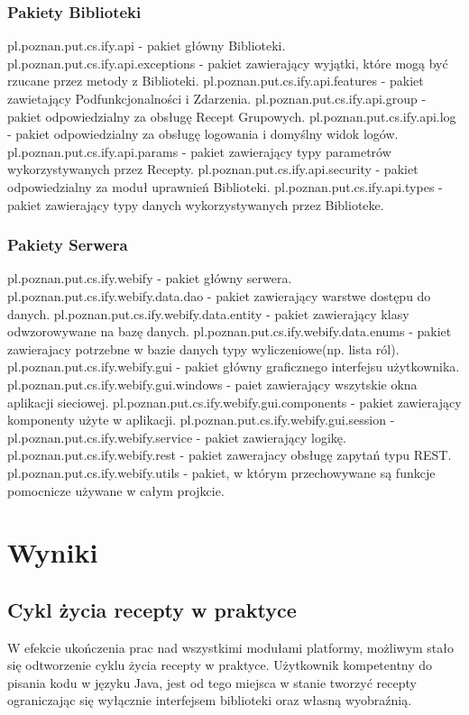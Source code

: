 \documentclass[11pt,a4paper,polish,thesis]{dcsbook}
\begin{document}
\subsection{Pakiety Biblioteki}
pl.poznan.put.cs.ify.api - pakiet główny Biblioteki.
pl.poznan.put.cs.ify.api.exceptions - pakiet zawierający wyjątki, które mogą być rzucane przez metody z Biblioteki.
pl.poznan.put.cs.ify.api.features - pakiet zawietający Podfunkcjonalności i Zdarzenia.
pl.poznan.put.cs.ify.api.group - pakiet odpowiedzialny za obsługę Recept Grupowych.
pl.poznan.put.cs.ify.api.log - pakiet odpowiedzialny za obsługę logowania i domyślny widok logów.
pl.poznan.put.cs.ify.api.params - pakiet zawierający typy parametrów wykorzystywanych przez Recepty.
pl.poznan.put.cs.ify.api.security - pakiet odpowiedzialny za moduł uprawnień Biblioteki.
pl.poznan.put.cs.ify.api.types - pakiet zawierający typy danych wykorzystywanych przez Biblioteke.
\subsection{Pakiety Serwera}
pl.poznan.put.cs.ify.webify - pakiet główny serwera.
pl.poznan.put.cs.ify.webify.data.dao - pakiet zawierający warstwe dostępu do danych.
pl.poznan.put.cs.ify.webify.data.entity - pakiet zawierający klasy odwzorowywane na bazę danych.
pl.poznan.put.cs.ify.webify.data.enums - pakiet zawierajacy potrzebne w bazie danych typy wyliczeniowe(np. lista ról). 
pl.poznan.put.cs.ify.webify.gui - pakiet główny graficznego interfejsu użytkownika.
pl.poznan.put.cs.ify.webify.gui.windows - paiet zawierający wszytskie okna aplikacji sieciowej.
pl.poznan.put.cs.ify.webify.gui.components - pakiet zawierający komponenty użyte w aplikacji.
pl.poznan.put.cs.ify.webify.gui.session - 
pl.poznan.put.cs.ify.webify.service - pakiet zawierający logikę.
pl.poznan.put.cs.ify.webify.rest - pakiet zawerajacy obsługę zapytań typu REST.
pl.poznan.put.cs.ify.webify.utils - pakiet, w którym przechowywane są funkcje pomocnicze używane w całym projkcie.

\chapter{Wyniki}
\section{Cykl życia recepty w praktyce}
W efekcie ukończenia prac nad wszystkimi modułami platformy, możliwym stało się odtworzenie cyklu życia recepty w praktyce. Użytkownik kompetentny do pisania
kodu w języku Java, jest od tego miejsca w stanie tworzyć recepty ograniczając się wyłącznie interfejsem biblioteki oraz własną wyobraźnią.
\end{document}
